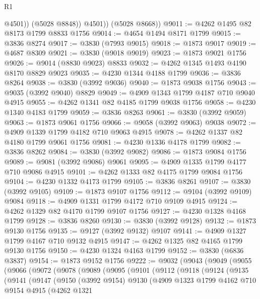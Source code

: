 \begin{lexlean}{R1}
\begin{coremodule}
                @4501))
            (@5028 @8848))
          @4501))
      (@5028 @8668))
@9011 := @4262 @1495 @82 @8173 @1799 @8833 @1756
@9014 := @4654 @1494 @8171 @1799
@9015 := @3836 @8274
@9017 := @3830 (@7993 @9015)
@9018 := @1873 @9017
@9019 := @4687 @8309
@9021 := @3830 (@9018 @9019)
@9023 := @1873 @9021 @1756
@9026 := @9014 (@8830 @9023) @8833
@9032 := @4262 @1345 @1493 @4190 @8170 @8829 @9023
@9035 := @4230 @1344 @4188 @1799
@9036 := @3836 @8264
@9038 := @3830 (@3992 @9036)
@9040 := @1873 @9038 @1756
@9043 := @9035 (@3992 @9040) @8829
@9049 := @4909 @1343 @1799 @4187 @710 @9040 @4915
@9055 := @4262 @1341 @82 @4185 @1799 @9038 @1756
@9058 := @4230 @1340 @4183 @1799
@9059 := @3836 @8263
@9061 := @3830 (@3992 @9059)
@9063 := @1873 @9061 @1756
@9066 := @9058 (@3992 @9063) @9038
@9072 := @4909 @1339 @1799 @4182 @710 @9063 @4915
@9078 := @4262 @1337 @82 @4180 @1799 @9061 @1756
@9081 := @4230 @1336 @4178 @1799
@9082 := @3836 @8262
@9084 := @3830 (@3992 @9082)
@9086 := @1873 @9084 @1756
@9089 := @9081 (@3992 @9086) @9061
@9095 := @4909 @1335 @1799 @4177 @710 @9086 @4915
@9101 := @4262 @1333 @82 @4175 @1799 @9084 @1756
@9104 := @4230 @1332 @4173 @1799
@9105 := @3836 @8261
@9107 := @3830 (@3992 @9105)
@9109 := @1873 @9107 @1756
@9112 := @9104 (@3992 @9109) @9084
@9118 := @4909 @1331 @1799 @4172 @710 @9109 @4915
@9124 := @4262 @1329 @82 @4170 @1799 @9107 @1756
@9127 := @4230 @1328 @4168 @1799
@9128 := @3836 @8260
@9130 := @3830 (@3992 @9128)
@9132 := @1873 @9130 @1756
@9135 := @9127 (@3992 @9132) @9107
@9141 := @4909 @1327 @1799 @4167 @710 @9132 @4915
@9147 := @4262 @1325 @82 @4165 @1799 @9130 @1756
@9150 := @4230 @1324 @4163 @1799
@9152 := @3830 (@6836 @3837)
@9154 := @1873 @9152 @1756
@9222 := @9032
    (@9043
      (@9049
        (@9055
          (@9066
            (@9072
              (@9078
                (@9089
                  (@9095
                    (@9101
                      (@9112
                        (@9118
                          (@9124
                            (@9135
                              (@9141
                                (@9147
                                  (@9150
                                    (@3992 @9154)
                                    @9130
                                    (@4909
                                      @1323
                                      @1799
                                      @4162
                                      @710
                                      @9154
                                      @4915
                                      (@4262
                                        @1321

\end{coremodule}
\end{lexlean}
